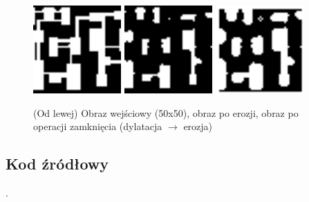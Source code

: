 \documentclass[final,a4paper,openany,12pt]{mwbk}
\begin{document}
\begin{figure}[H]
	\begin{center}
		\includegraphics[width=0.3\textwidth]{2/2Bin_Cl_Original}
		\includegraphics[width=0.3\textwidth]{2/2Bin_Cl_D_Result}
		\includegraphics[width=0.3\textwidth]{2/2Bin_Cl_DE_Result}
	\end{center}
	\caption{(Od lewej) Obraz wejściowy (50x50), obraz po erozji, obraz po operacji zamknięcia (dylatacja $\rightarrow$ erozja)}
\end{figure}


\subsection*{Kod źródłowy}
.
\end{document}
